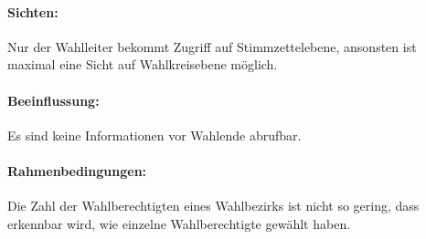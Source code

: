 \documentclass[a4paper]{article}
\begin{document}
\paragraph{Sichten:} Nur der Wahlleiter bekommt Zugriff auf Stimmzettelebene, ansonsten ist maximal eine Sicht auf Wahlkreisebene möglich.

\paragraph{Beeinflussung:} Es sind keine Informationen vor Wahlende abrufbar.

\paragraph{Rahmenbedingungen:} Die Zahl der Wahlberechtigten eines Wahlbezirks ist nicht so gering, dass erkennbar wird, wie einzelne Wahlberechtigte gewählt haben.
\end{document}
